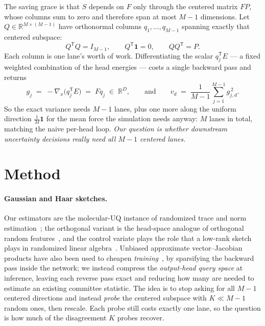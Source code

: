 \documentclass{article}
\begin{document}
The saving grace is that $S$ depends on $F$ only through the centered matrix $FP$, whose columns sum
to zero and therefore span at most $M-1$ dimensions. Let $Q\in\mathbb{R}^{M\times(M-1)}$ have
orthonormal columns $q_1,\dots,q_{M-1}$ spanning exactly that centered subspace:
\begin{equation*}
Q^{\mathsf T}Q=I_{M-1},\qquad Q^{\mathsf T}\mathbf 1=0,\qquad QQ^{\mathsf T}=P .
\end{equation*}
Each column is one lane's worth of work. Differentiating the scalar $q_j^{\mathsf T}E$ --- a fixed
weighted combination of the head energies --- costs a single backward pass and returns
\begin{equation}
g_j\;=\;-\nabla_x\bigl(q_j^{\mathsf T}E\bigr)\;=\;Fq_j\;\in\;\mathbb{R}^{D},
\qquad\text{and}\qquad
v_d\;=\;\frac{1}{M-1}\sum_{j=1}^{M-1} g_{j,d}^{\,2} .
\end{equation}
So the exact variance needs $M-1$ lanes, plus one more along the uniform direction
$\tfrac1M\mathbf 1$ for the mean force the simulation needs anyway: $M$ lanes in total, matching the
naive per-head loop. \emph{Our question is whether downstream uncertainty decisions really need all
$M-1$ centered lanes.}

\section{Method}
\label{sec:method}
\paragraph{Gaussian and Haar sketches.}
Our estimators are the molecular-UQ instance of randomized trace and norm
estimation~\citep{hutchinson,avron2011,hutchpp}; the orthogonal variant is the head-space analogue of
orthogonal random features~\citep{yu2016orf}, and the control variate plays the role that a low-rank
sketch plays in randomized linear algebra~\citep{halko2011}. Unbiased approximate vector--Jacobian
products have also been used to cheapen \emph{training}~\citep{bakong2026vjp}, by sparsifying the
backward pass inside the network; we instead compress the \emph{output-head query space} at
inference, leaving each reverse pass exact and reducing how many are needed to estimate an existing
committee statistic.
The idea is to stop asking for all $M-1$ centered directions and instead \emph{probe} the centered
subspace with $K\ll M-1$ random ones, then rescale. Each probe still costs exactly one lane, so the
question is how much of the disagreement $K$ probes recover.
\end{document}

